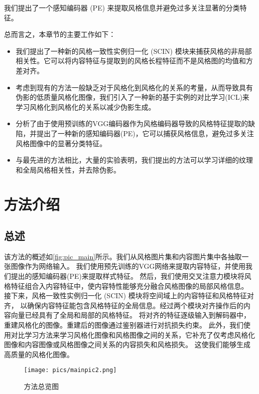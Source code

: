 我们提出了一个感知编码器 (PE) 来提取风格信息并避免过多关注显著的分类特征。
\par 总而言之，本章节的主要工作如下： 
\begin{itemize}
    \item 我们提出了一种新的风格一致性实例归一化 (SCIN) 模块来捕获风格的非局部相关性。它可以将内容特征与提取到的风格长程特征而不是风格图的均值和方差对齐。
    \item 考虑到现有的方法一般缺乏对于风格化到风格化的关系的考量，从而导致具有伪影的低质量风格化图像，我们引入了一种新的基于实例的对比学习(ICL)来学习风格化到风格化的关系以减少伪影生成。
    \item 分析了由于使用预训练的VGG编码器作为风格编码器导致的风格特征提取的缺陷，并提出了一种新的感知编码器(PE)，它可以捕获风格信息，避免过多关注风格图像中的显著分类特征。
    \item 与最先进的方法相比，大量的实验表明，我们提出的方法可以学习详细的纹理和全局风格相关性，并去除伪影。
\end{itemize}

\section{方法介绍}
\subsection{总述}
\par 该方法的概述如\autoref{fig:pic_main}所示。我们从风格图片集和内容图片集中各抽取一张图像作为网络输入。
我们使用预先训练的VGG网络来提取内容特征，并使用我们提出的感知编码器(PE)来提取样式特征。
然后，我们使用交叉注意力模块将风格特征组合入内容特征中，使内容特性能够充分融合风格图像的局部风格信息。
接下来，风格一致性实例归一化 (SCIN) 模块将空间域上的内容特征和风格特征对齐，
以确保内容特征能包含风格特征的全局信息。经过两个模块对齐操作后的内容向量已经具有了全局和局部的风格特征。
将对齐的特征逐级输入到解码器中，重建风格化的图像。重建后的图像通过鉴别器进行对抗损失约束。
此外，我们使用对比学习方法来学习风格化图像和风格图像之间的关系，它补充了仅考虑风格化图像和内容图像或风格图像之间关系的内容损失和风格损失。
这使我们能够生成高质量的风格化图像。
\begin{figure}[htbp]
    \centering
    \texttt{[image: pics/mainpic2.png]}
    \caption{\label{fig:pic_main}方法总览图}
\end{figure}
